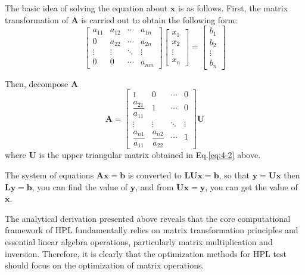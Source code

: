 The basic idea of solving the equation about $\mathbf{x}$ is as follows. 
First, the matrix transformation of $\mathbf{A}$ is carried out to obtain the following form:
\begin{equation}
\begin{bmatrix}
a_{11} & a_{12} & \cdots & a_{1n} \\
0     & a_{22} & \cdots & a_{2n} \\
\vdots & \vdots & \ddots & \vdots \\
0     & 0      & \cdots & a_{mn}
\end{bmatrix}
\begin{bmatrix}
x_1 \\ x_2 \\ \vdots \\ x_n
\end{bmatrix}
=
\begin{bmatrix}
b_1 \\ b_2 \\ \vdots \\ b_n
\end{bmatrix}
\label{eq:4-2}
\end{equation}

Then, decompose $\mathbf{A}$
\begin{equation}
\mathbf{A} = 
\begin{bmatrix}
1 & 0 & \cdots & 0 \\
\dfrac{a_{21}}{a_{11}} & 1 & \cdots & 0 \\
\vdots & \vdots & \ddots & \vdots \\
\dfrac{a_{n1}}{a_{11}} & \dfrac{a_{n2}}{a_{22}} & \cdots & 1
\end{bmatrix}
\mathbf{U}
\label{eq:4-3}
\end{equation}
where $\mathbf{U}$ is the upper triangular matrix obtained in Eq.\ref{eq:4-2} above.

The system of equations $\mathbf{Ax}{=}\mathbf{b}$ is converted to $\mathbf{LUx}{=}\mathbf{b}$, so that $\mathbf{y}{=}\mathbf{Ux}$ then $\mathbf{Ly}{=}\mathbf{b}$, you can find the value of  $\mathbf{y}$, and from  $\mathbf{Ux}{=}\mathbf{y}$, you can get the value of $\mathbf{x}$.

The analytical derivation presented above reveals that the core computational framework of HPL fundamentally relies on matrix transformation principles and essential linear algebra operations, particularly matrix multiplication and inversion. Therefore, it is clearly that the optimization methods for HPL test should focus on the optimization of matrix operations.
 

